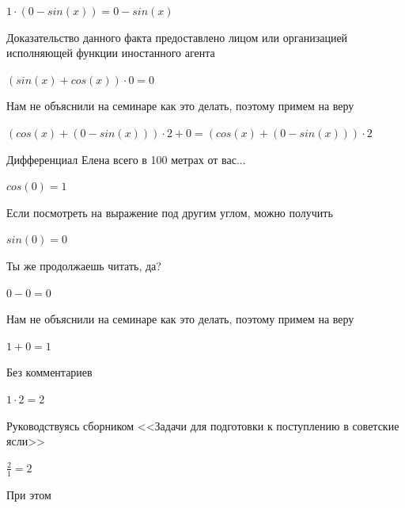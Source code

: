 \documentclass[12pt,a4paper,fleqn]{article}
\begin{document}
\begin{center}
$1 \cdot (0-sin(x)) = 0-sin(x)$\end{center}
Доказательство данного факта предоставлено лицом или организацией исполняющей функции иностанного агента

\begin{center}
$(sin(x)+cos(x)) \cdot 0 = 0$\end{center}
Нам не объяснили на семинаре как это делать, поэтому примем на веру

\begin{center}
$(cos(x)+(0-sin(x))) \cdot 2+0 = (cos(x)+(0-sin(x))) \cdot 2$\end{center}
Дифференциал Елена всего в 100 метрах от вас...

\begin{center}
\end{center}
\begin{center}$cos(0) = 1$\end{center}
Если посмотреть на выражение под другим углом, можно получить

\begin{center}
\end{center}
\begin{center}$sin(0) = 0$\end{center}
Ты же продолжаешь читать, да?

\begin{center}
\end{center}
\begin{center}$0-0 = 0$\end{center}
Нам не объяснили на семинаре как это делать, поэтому примем на веру

\begin{center}
\end{center}
\begin{center}$1+0 = 1$\end{center}
Без комментариев\cite{link4}

\begin{center}
\end{center}
\begin{center}$1 \cdot 2 = 2$\end{center}
Руководствуясь сборником <<Задачи для подготовки к поступлению в советские ясли>>\cite{link1}

\begin{center}
\end{center}
\begin{center}$\frac{2}{1} = 2$\end{center}
При этом
\end{document}
